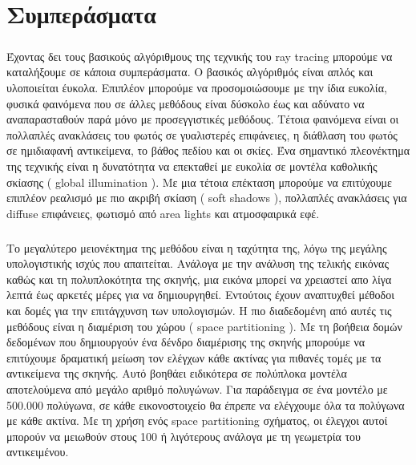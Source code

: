 
\def\baselinestretch{1}

\chapter{Συμπεράσματα}

\ifpdf
    \graphicspath{{Conclusions/ConclusionsFigs/PNG/}{Conclusions/ConclusionsFigs/PDF/}{Conclusions/ConclusionsFigs/}}
\else
    \graphicspath{{Conclusions/ConclusionsFigs/EPS/}{Conclusions/ConclusionsFigs/}}
\fi

\def\baselinestretch{1.66}

\begin{sloppypar}

\paragraph{}
	Έχοντας δει τους βασικούς αλγόριθμους της τεχνικής του ray tracing μπορούμε να καταλήξουμε σε
κάποια συμπεράσματα. Ο βασικός αλγόριθμός είναι απλός και υλοποιείται έυκολα. Επιπλέον μπορούμε να
προσομοιώσουμε με την ίδια ευκολία, φυσικά φαινόμενα που σε άλλες μεθόδους είναι δύσκολο έως και αδύνατο
να αναπαρασταθούν παρά μόνο με προσεγγιστικές μεθόδους. Τέτοια φαινόμενα είναι οι πολλαπλές ανακλάσεις του 
φωτός σε γυαλιστερές επιφάνειες, η διάθλαση του φωτός σε ημιδιαφανή αντικείμενα, το βάθος πεδίου και οι σκίες.
Ένα σημαντικό πλεονέκτημα της τεχνικής είναι η δυνατότητα να επεκταθεί με ευκολία σε μοντέλα καθολικής σκίασης
( global illumination ). Με μια τέτοια επέκταση μπορούμε να επιτύχουμε επιπλέον ρεαλισμό με πιο ακριβή σκίαση ( soft
shadows ), πολλαπλές ανακλάσεις για diffuse επιφάνειες, φωτισμό από area lights και ατμοσφαιρικά εφέ.

\paragraph{}
	Το μεγαλύτερο μειονέκτημα της μεθόδου είναι η ταχύτητα της, λόγω της μεγάλης υπολογιστικής ισχύς
που απαιτείται. Ανάλογα με την ανάλυση της τελικής εικόνας καθώς και τη πολυπλοκότητα της σκηνής,
μια εικόνα μπορεί να χρειαστεί απο λίγα λεπτά έως αρκετές μέρες για να δημιουργηθεί. Εντούτοις έχουν
αναπτυχθεί μέθοδοι και δομές για την επιτάγχυνση των υπολογισμών. Η πιο διαδεδομένη από αυτές τις μεθόδους
είναι η διαμέριση του χώρου ( space partitioning ). Με τη βοήθεια δομών δεδομένων που δημιουργούν ένα
δένδρο διαμέρισης της σκηνής μπορούμε να επιτύχουμε δραματική μείωση τον ελέγχων κάθε ακτίνας για πιθανές 
τομές με τα αντικείμενα της σκηνής. Αυτό βοηθάει ειδικότερα σε πολύπλοκα μοντέλα αποτελούμενα από μεγάλο 
αριθμό πολυγώνων. Για παράδειγμα σε ένα μοντέλο με 500.000 πολύγωνα, σε κάθε εικονοστοιχείο θα έπρεπε να 
ελέγχουμε όλα τα πολύγωνα με κάθε ακτίνα. Με τη χρήση ενός space partitioning σχήματος, οι έλεγχοι 
αυτοί μπορούν να μειωθούν στους 100 ή λιγότερους ανάλογα με τη γεωμετρία του αντικειμένου.

\end{sloppypar}

